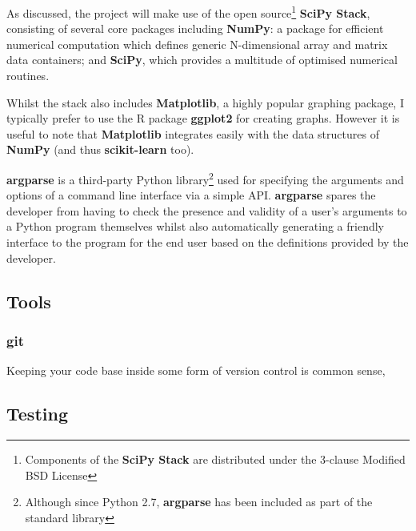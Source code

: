 As discussed, the project will make use of the open source\footnote{Components
of the \textbf{SciPy Stack} are distributed under the 3-clause Modified BSD
License\citep{scipy-lic}\citep{numpy-lic}} \textbf{SciPy Stack}, consisting of
several core packages including \textbf{NumPy}\citep{NumPySciPy}: a package for
efficient numerical computation which defines generic N-dimensional array and
matrix data containers; and \textbf{SciPy}\citep{SciPy}, which provides a
multitude of optimised numerical routines.

Whilst the stack also includes \textbf{Matplotlib}, a highly popular graphing
package, I typically prefer to use the R package \textbf{ggplot2}\citep{ggplot2}
for creating graphs. However it is useful to note that \textbf{Matplotlib}
integrates easily with the data structures of \textbf{NumPy} (and thus
\textbf{scikit-learn} too).

\textbf{argparse} is a third-party Python library\footnote{Although since Python
2.7, \textbf{argparse} has been included as part of the standard
library\citep{argparse-pypi}} used for specifying the arguments and options of a
command line interface via a simple API.  \textbf{argparse} spares the developer
from having to check the presence and validity of a user's arguments to a Python
program themselves whilst also automatically generating a friendly interface to
the program for the end user based on the definitions provided by the developer.


\subsection{Tools}
\label{part1:dev:tools}

\subsubsection{git}

Keeping your code base inside some form of version control is common sense,



\subsection{Testing}
\label{sec:part1:testing}

